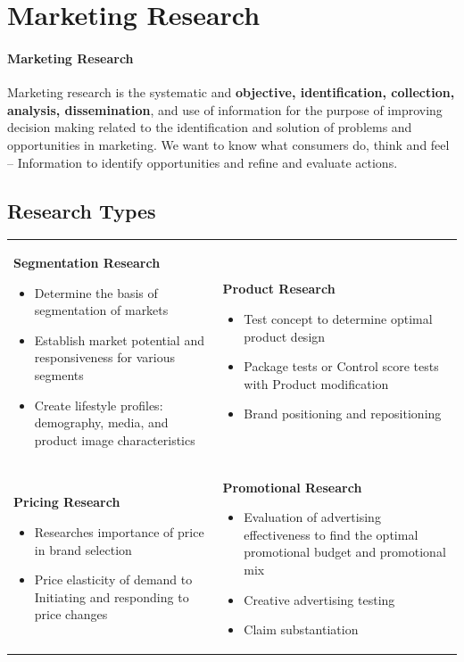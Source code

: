 \documentclass[11pt]{article}
\begin{document}
    \section{Marketing Research}
    
    \paragraph{Marketing Research} Marketing research is the systematic and \textbf{objective, identification, collection, analysis, dissemination}, 
    and use of information for the purpose of improving decision making related to the identification and solution of problems and opportunities in marketing. 
    We want to know what consumers do, think and feel – Information to identify opportunities and refine and evaluate actions.
    
    \subsection{Research Types}

    \begin{tabular}{ p{5.5cm} p{6cm} }
        \textbf{Segmentation Research}
        \begin{itemize}
            \item Determine the basis of segmentation of markets
            \item Establish market potential and responsiveness for various segments
            \item Create lifestyle profiles: demography, media, and product image characteristics
        \end{itemize}
        &
        \textbf{Product Research}
        \begin{itemize}
            \item Test concept to determine optimal product design
            \item Package tests or Control score tests with Product modification
            \item Brand positioning and repositioning
        \end{itemize}
        \\
        \textbf{Pricing Research}
        \begin{itemize}
            \item Researches importance of price in brand selection
            \item Price elasticity of demand to Initiating and responding to price changes
        \end{itemize}
        &
        \textbf{Promotional Research}
        \begin{itemize}
            \item  Evaluation of advertising effectiveness to find the optimal promotional budget and promotional mix
            \item Creative advertising testing
            \item Claim substantiation
        \end{itemize}
        \\
    \end{tabular}
\end{document}
